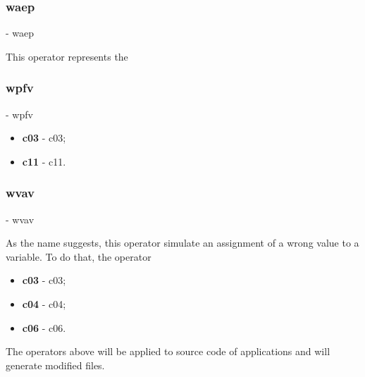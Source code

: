 	\subsubsection{\textbf{\acs{waep}}} - \Acl{waep}
	\hypertarget{waep}{}

	This operator represents the


	\subsubsection{\textbf{\acs{wpfv}}} - \Acl{wpfv}
	\hypertarget{wpfv}{}

	\begin{itemize}
		\item \textbf{\acs{c03}} - \Acl{c03};
		\item \textbf{\acs{c11}} - \Acl{c11}.
	\end{itemize}

	\subsubsection{\textbf{\acs{wvav}}} - \Acl{wvav}
	\hypertarget{wvav}{}

	As the name suggests, this operator simulate an assignment of a wrong value to a variable. To do that, the operator

	\begin{itemize}
		\item \textbf{\acs{c03}} - \Acl{c03};
		\item \textbf{\acs{c04}} - \Acl{c04};
		\item \textbf{\acs{c06}} - \Acl{c06}.
	\end{itemize}

The operators above will be applied to source code of applications and will generate modified files.

\clearpage
